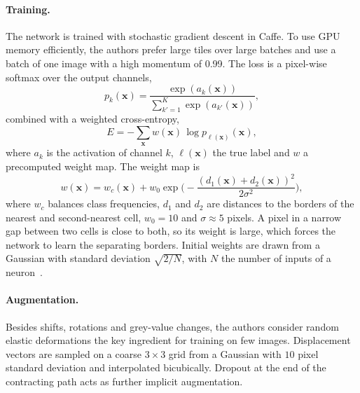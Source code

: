 \documentclass[10pt,twocolumn]{article}
\begin{document}
\paragraph{Training.} The network is trained with stochastic gradient descent in Caffe. To use GPU memory efficiently, the authors prefer large tiles over large batches and use a batch of one image with a high momentum of 0.99. The loss is a pixel-wise softmax over the output channels,
\begin{equation}
p_k(\mathbf{x}) = \frac{\exp(a_k(\mathbf{x}))}{\sum_{k'=1}^{K}\exp(a_{k'}(\mathbf{x}))},
\end{equation}
combined with a weighted cross-entropy,
\begin{equation}
E = -\sum_{\mathbf{x}} w(\mathbf{x})\,\log p_{\ell(\mathbf{x})}(\mathbf{x}),
\end{equation}
where $a_k$ is the activation of channel $k$, $\ell(\mathbf{x})$ the true label and $w$ a precomputed weight map. The weight map is
\begin{equation}
w(\mathbf{x}) = w_c(\mathbf{x}) + w_0\exp\!\Big(-\frac{(d_1(\mathbf{x})+d_2(\mathbf{x}))^2}{2\sigma^2}\Big),
\end{equation}
where $w_c$ balances class frequencies, $d_1$ and $d_2$ are distances to the borders of the nearest and second-nearest cell, $w_0=10$ and $\sigma\approx5$ pixels. A pixel in a narrow gap between two cells is close to both, so its weight is large, which forces the network to learn the separating borders. Initial weights are drawn from a Gaussian with standard deviation $\sqrt{2/N}$, with $N$ the number of inputs of a neuron~\cite{he}.

\paragraph{Augmentation.} Besides shifts, rotations and grey-value changes, the authors consider random elastic deformations the key ingredient for training on few images. Displacement vectors are sampled on a coarse $3\times3$ grid from a Gaussian with $10$ pixel standard deviation and interpolated bicubically. Dropout at the end of the contracting path acts as further implicit augmentation.
\end{document}

